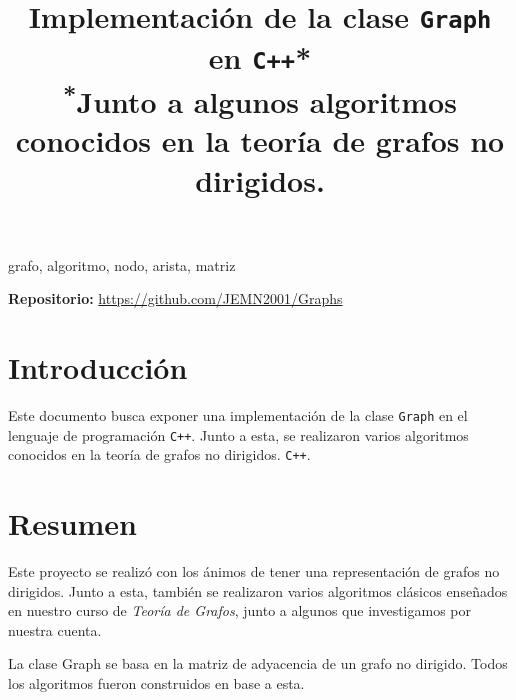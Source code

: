 \documentclass[conference]{IEEEtran}
\begin{document}
\title{Implementación de la clase \texttt{Graph} en \texttt{C++}*\\
{\footnotesize \textsuperscript{*}Junto a algunos algoritmos conocidos en la teoría de grafos no dirigidos.}
}

\author{
\and
{}
}


\maketitle

\begin{IEEEkeywords}
grafo, algoritmo, nodo, arista, matriz
\end{IEEEkeywords}

\textbf{Repositorio:} \url{https://github.com/JEMN2001/Graphs}
\section{Introducción}
Este documento busca exponer una implementación de la clase \texttt{Graph} en el lenguaje de programación \texttt{C++}. Junto a esta, se realizaron varios algoritmos conocidos en la teoría de grafos no dirigidos. \texttt{C++}.

\section{Resumen}

Este proyecto se realizó con los ánimos de tener una representación de grafos no dirigidos. Junto a esta, también se realizaron varios algoritmos clásicos enseñados en nuestro curso de \textit{Teoría de Grafos}, junto a algunos que investigamos por nuestra cuenta. 

La clase Graph se basa en la matriz de adyacencia de un grafo no dirigido. Todos los algoritmos fueron construidos en base a esta.
\end{document}
